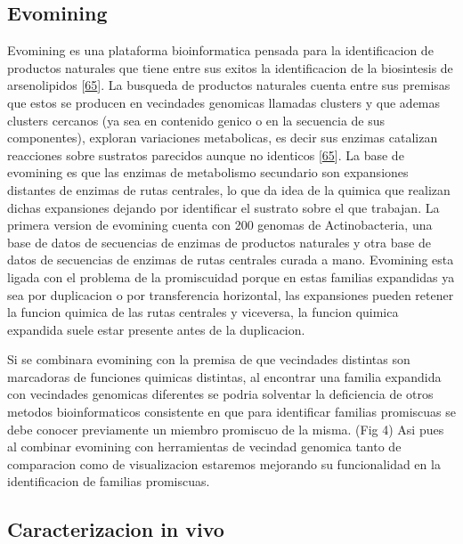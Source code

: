 \documentclass[12pt,twoside]{reedthesis}
\begin{document}
  \subsection{Evomining}\label{evomining}
  
  Evomining es una plataforma bioinformatica pensada para la
  identificacion de productos naturales que tiene entre sus exitos la
  identificacion de la biosintesis de arsenolipidos
  {[}\protect\hyperlink{ref-cruz-moralesux5fphylogenomicux5f2016}{65}{]}.
  La busqueda de productos naturales cuenta entre sus premisas que estos
  se producen en vecindades genomicas llamadas clusters y que ademas
  clusters cercanos (ya sea en contenido genico o en la secuencia de sus
  componentes), exploran variaciones metabolicas, es decir sus enzimas
  catalizan reacciones sobre sustratos parecidos aunque no identicos
  {[}\protect\hyperlink{ref-cruz-moralesux5fphylogenomicux5f2016}{65}{]}.
  La base de evomining es que las enzimas de metabolismo secundario son
  expansiones distantes de enzimas de rutas centrales, lo que da idea de
  la quimica que realizan dichas expansiones dejando por identificar el
  sustrato sobre el que trabajan. La primera version de evomining cuenta
  con 200 genomas de Actinobacteria, una base de datos de secuencias de
  enzimas de productos naturales y otra base de datos de secuencias de
  enzimas de rutas centrales curada a mano. Evomining esta ligada con el
  problema de la promiscuidad porque en estas familias expandidas ya sea
  por duplicacion o por transferencia horizontal, las expansiones pueden
  retener la funcion quimica de las rutas centrales y viceversa, la
  funcion quimica expandida suele estar presente antes de la duplicacion.
  
  Si se combinara evomining con la premisa de que vecindades distintas son
  marcadoras de funciones quimicas distintas, al encontrar una familia
  expandida con vecindades genomicas diferentes se podria solventar la
  deficiencia de otros metodos bioinformaticos consistente en que para
  identificar familias promiscuas se debe conocer previamente un miembro
  promiscuo de la misma. (Fig 4) Asi pues al combinar evomining con
  herramientas de vecindad genomica tanto de comparacion como de
  visualizacion estaremos mejorando su funcionalidad en la identificacion
  de familias promiscuas.
  
  \subsection{Caracterizacion in vivo}\label{caracterizacion-in-vivo}
  
\end{document}
